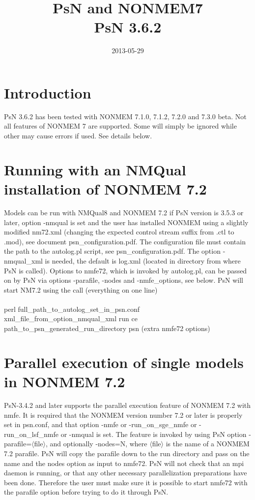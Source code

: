 \documentclass[a4paper,12pt]{article}
\title{PsN and NONMEM7\\ \vspace{2 mm} {\large PsN 3.6.2}}
\date{2013-05-29}
\begin{document}
\maketitle


\section{Introduction}
PsN 3.6.2 has been tested with NONMEM 7.1.0, 7.1.2,  7.2.0 and 7.3.0 beta. Not all features of NONMEM 7 are supported. Some will simply be ignored while other may cause errors if used. See details below.

\section{Running with an NMQual installation of NONMEM 7.2}

Models can be run with NMQual8 and NONMEM 7.2 if PsN version is 3.5.3 or later, option -nmqual is set and the user has installed NONMEM using a slightly modified nm72.xml (changing the expected control stream suffix from .ctl to .mod), see document psn\_configuration.pdf. The configuration file must contain the path to the autolog.pl script, see psn\_configuration.pdf. The option -nmqual\_xml is needed, the default is log.xml (located in directory from where PsN is called). Options to nmfe72, which is invoked by autolog.pl, can be passed on by PsN via options -parafile, -nodes and -nmfe\_options, see below. PsN will start NM7.2 using the call (everything on one line)
\\
\\
perl    full\_path\_to\_autolog\_set\_in\_psn.conf    xml\_file\_from\_option\_nmqual\_xml    run    ce path\_to\_psn\_generated\_run\_directory    psn (extra nmfe72 options)


\section{Parallel execution of single models in NONMEM 7.2}

PsN-3.4.2 and later supports the parallel execution feature of NONMEM 7.2 with nmfe. It is required that the NONMEM version number 7.2 or later is properly set in psn.conf, and that option -nmfe or -run\_on\_sge\_nmfe or -run\_on\_lsf\_nmfe or -nmqual is set. The feature is invoked by using PsN option -parafile=$\langle$file$\rangle$, and optionally -nodes=N, where $\langle$file$\rangle$ is the name of a NONMEM 7.2 parafile. PsN will copy the parafile down to the run directory and pass on the name and the nodes option as input to nmfe72. PsN will not check that an mpi daemon is running, or that any other necessary parallelization preparations have been done. Therefore the user must make sure it is possible to start nmfe72 with the parafile option before trying to do it through PsN.
\end{document}
